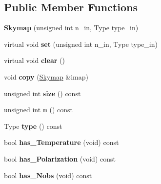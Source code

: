 \subsection*{Public Member Functions}
\begin{DoxyCompactItemize}
\item 
\hypertarget{classSkymap_a98100b6b91c5e1f9a0be8bf943fe8767}{
{\bfseries Skymap} (unsigned int n\_\-in, Type type\_\-in)}
\label{classSkymap_a98100b6b91c5e1f9a0be8bf943fe8767}

\item 
\hypertarget{classSkymap_a6a7b2f8b245ea95159a58a48b3f837e2}{
virtual void {\bfseries set} (unsigned int n\_\-in, Type type\_\-in)}
\label{classSkymap_a6a7b2f8b245ea95159a58a48b3f837e2}

\item 
\hypertarget{classSkymap_a63032365298b6dc3fc88b787461513a1}{
virtual void {\bfseries clear} ()}
\label{classSkymap_a63032365298b6dc3fc88b787461513a1}

\item 
\hypertarget{classSkymap_a436cad4e936311ba3ef9d5a58428a252}{
void {\bfseries copy} (\hyperlink{classSkymap}{Skymap} \&imap)}
\label{classSkymap_a436cad4e936311ba3ef9d5a58428a252}

\item 
\hypertarget{classSkymap_a02e02c6987fd28bb0e8d23d3838dc89f}{
unsigned int {\bfseries size} () const }
\label{classSkymap_a02e02c6987fd28bb0e8d23d3838dc89f}

\item 
\hypertarget{classSkymap_ad2c03c69d9f19860860c619e248e8d26}{
unsigned int {\bfseries n} () const }
\label{classSkymap_ad2c03c69d9f19860860c619e248e8d26}

\item 
\hypertarget{classSkymap_aa8bcceaeb9523e0723435d53335e11c1}{
Type {\bfseries type} () const }
\label{classSkymap_aa8bcceaeb9523e0723435d53335e11c1}

\item 
\hypertarget{classSkymap_a418e539bf2aae7823ca5a774e84d9f35}{
bool {\bfseries has\_\-Temperature} (void) const }
\label{classSkymap_a418e539bf2aae7823ca5a774e84d9f35}

\item 
\hypertarget{classSkymap_a4be6a49da0b2a0259695a3020f6fe0ad}{
bool {\bfseries has\_\-Polarization} (void) const }
\label{classSkymap_a4be6a49da0b2a0259695a3020f6fe0ad}

\item 
\hypertarget{classSkymap_ab85671bb2ec3de6c1f8736f70d8d0cd4}{
bool {\bfseries has\_\-Nobs} (void) const }
\label{classSkymap_ab85671bb2ec3de6c1f8736f70d8d0cd4}


\end{DoxyCompactItemize}
